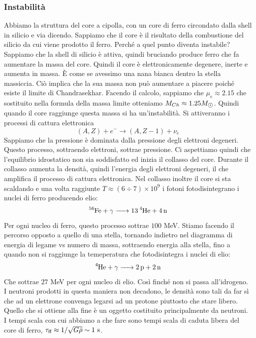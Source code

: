 \subsubsection*{Instabilità}
Abbiamo la struttura del core a cipolla, con un core di ferro circondato dalla shell in silicio e via dicendo. Sappiamo che il core è il risultato della combustione del silicio da cui viene prodotto il ferro. Perché a quel punto diventa instabile? Sappiamo che la shell di silicio è attiva, quindi bruciando produce ferro che fa aumentare la massa del core. Quindi il core è elettronicamente degenere, inerte e aumenta in massa. È come se avessimo una nana bianca dentro la stella massiccia. Ciò implica che la sua massa non può aumentare a piacere poiché esiste il limite di Chandrasekhar. Facendo il calcolo, sappiamo che $\mu_e\approx2.15$ che sostituito nella formula della massa limite otteniamo $M_{Ch}\approx 1.25\sunmass$. Quindi quando il core raggiunge questa massa si ha un'instabilità. Si attiveranno i processi di cattura elettronica
\begin{equation*}
    (A,Z)+e^- \to (A, Z-1)+\nu_e
\end{equation*}
Sappiamo che la pressione è dominata dalla pressione degli elettroni degeneri. Questo processo, sottraendo elettroni, sottrae pressione. Ci aspettiamo quindi che l'equilibrio idrostatico non sia soddisfatto ed inizia il collasso del core. Durante il collasso aumenta la densità, quindi l'energia degli elettroni degeneri, il che amplifica il processo di cattura elettronica. Nel collasso inoltre il core si sta scaldando e una volta raggiunte $T\approx (6\div7)\times10^9$ i fotoni fotodisintegrano i nuclei di ferro producendo elio:
\begin{equation*}
    \ce{{}^{56}Fe +{\gamma}  -> 13{}^{4}He +4n}
\end{equation*}
Per ogni nucleo di ferro, questo processo sottrae $100$ MeV. Stiamo facendo il percorso opposto a quello di una stella, tornando indietro nel diagramma di energia di legame vs numero di massa, sottraendo energia alla stella, fino a quando non si raggiunge la temeperatura che fotodisintegra i nuclei di elio:
\begin{equation*}
    \ce{^{4}He + {\gamma} -> 2p + 2n}
\end{equation*}
Che sottrae $27$ MeV per ogni nucleo di elio. Così finché non si passa all'idrogeno. I neutroni prodotti in questa maniera non decadono, le densità sono tali da far sì che ad un elettrone convenga legarsi ad un protone piuttosto che stare libero. Quello che si ottiene alla fine è un oggetto costituito principalmente da neutroni. I tempi scala con cui abbiamo a che fare sono tempi scala di caduta libera del core di ferro, $\tau_{\text{ff}}\approx 1/\sqrt{G\Bar{\rho}}\sim 1\text{ s}$.\\
